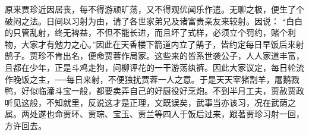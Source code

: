 \begin{parag}
    原来贾珍近因居丧，每不得游顽旷荡，又不得观优闻乐作遣。无聊之极，便生了个破闷之法。日间以习射为由，请了各世家弟兄及诸富贵亲友来较射。因说： “白白的只管乱射，终无裨益，不但不能长进，而且坏了式样，必须立个罚约，赌个利物，大家才有勉力之心。”因此在天香楼下箭道内立了鹄子，皆约定每日早饭后来射鹄子。贾珍不肯出名，便命贾蓉作局家。这些来的皆系世袭公子，人人家道丰富，且都在少年，正是斗鸡走狗，问柳评花的一干游荡纨裤。因此大家议定，每日轮流作晚饭之主，──每日来射，不便独扰贾蓉一人之意。于是天天宰猪割羊，屠鹅戮鸭，好似临潼斗宝一般，都要卖弄自己的好厨役好烹炮。不到半月工夫，贾赦贾政听见这般，不知就里，反说这才是正理，文既误矣，武事当亦该习，况在武荫之属。两处遂也命贾环、贾琮、宝玉、贾兰等四人于饭后过来，跟著贾珍习射一回，方许回去。
\end{parag}


